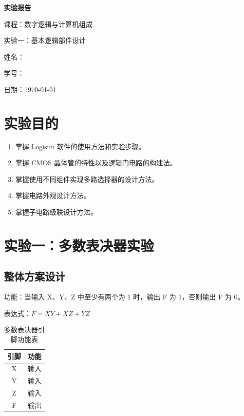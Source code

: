 \documentclass[12pt, a4paper]{ctexart}
\begin{document}
\begin{titlepage}
    \centering
    \vspace*{5cm}
    {\Huge\bfseries 实验报告\par}
    \vspace{2cm}
    {\Large 课程：数字逻辑与计算机组成\par}
    \vspace{1cm}
    {\Large 实验一：基本逻辑部件设计\par}
    \vspace{4cm}
    {\large 姓名：\underline{}\par}
    \vspace{1cm}
    {\large 学号：\underline{}\par}
    \vspace{1cm}
    {\large 日期：\today\par}
\end{titlepage}

\tableofcontents
\newpage

\section{实验目的}

\begin{enumerate}
    \item 掌握 Logisim 软件的使用方法和实验步骤。
    \item 掌握 CMOS 晶体管的特性以及逻辑门电路的构建法。
    \item 掌握使用不同组件实现多路选择器的设计方法。
    \item 掌握电路外观设计方法。
    \item 掌握子电路级联设计方法。
\end{enumerate}

\section{实验一：多数表决器实验}

\subsection{整体方案设计}

功能：当输入 X、Y、Z 中至少有两个为 1 时，输出 F 为 1，否则输出 F 为 0。

表达式：$F = XY + XZ + YZ$

\begin{table}[H]
    \centering
    \begin{tabular}{|c|c|}
        \hline
        引脚 & 功能 \\
        \hline
        X & 输入 \\
        Y & 输入 \\
        Z & 输入 \\
        F & 输出 \\
        \hline
    \end{tabular}
    \caption{多数表决器引脚功能表}
\end{table}
\end{document}

